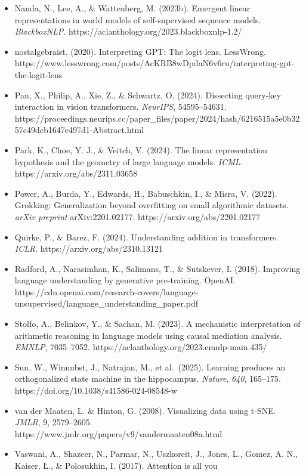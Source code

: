 \documentclass[
  11pt,
  a4paper,
]{article}
\begin{document}
\begin{itemize}
\item
  Nanda, N., Lee, A., \& Wattenberg, M. (2023b). Emergent linear
  representations in world models of self-supervised sequence models.
  \emph{BlackboxNLP}. https://aclanthology.org/2023.blackboxnlp-1.2/
\item
  nostalgebraist. (2020). Interpreting GPT: The logit lens. LessWrong.
  https://www.lesswrong.com/posts/AcKRB8wDpdaN6v6ru/interpreting-gpt-the-logit-lens
\item
  Pan, X., Philip, A., Xie, Z., \& Schwartz, O. (2024). Dissecting
  query-key interaction in vision transformers. \emph{NeurIPS},
  54595--54631.
  https://proceedings.neurips.cc/paper\_files/paper/2024/hash/6216515a5e0b3257c49dcb1647e497d1-Abstract.html
\item
  Park, K., Choe, Y. J., \& Veitch, V. (2024). The linear representation
  hypothesis and the geometry of large language models. \emph{ICML}.
  https://arxiv.org/abs/2311.03658
\item
  Power, A., Burda, Y., Edwards, H., Babuschkin, I., \& Misra, V.
  (2022). Grokking: Generalization beyond overfitting on small
  algorithmic datasets. \emph{arXiv preprint} arXiv:2201.02177.
  https://arxiv.org/abs/2201.02177
\item
  Quirke, P., \& Barez, F. (2024). Understanding addition in
  transformers. \emph{ICLR}. https://arxiv.org/abs/2310.13121
\item
  Radford, A., Narasimhan, K., Salimans, T., \& Sutskever, I. (2018).
  Improving language understanding by generative pre-training. OpenAI.
  https://cdn.openai.com/research-covers/language-unsupervised/language\_understanding\_paper.pdf
\item
  Stolfo, A., Belinkov, Y., \& Sachan, M. (2023). A mechanistic
  interpretation of arithmetic reasoning in language models using causal
  mediation analysis. \emph{EMNLP}, 7035--7052.
  https://aclanthology.org/2023.emnlp-main.435/
\item
  Sun, W., Winnubst, J., Natrajan, M., et al.~(2025). Learning produces
  an orthogonalized state machine in the hippocampus. \emph{Nature},
  \emph{640}, 165--175. https://doi.org/10.1038/s41586-024-08548-w
\item
  van der Maaten, L. \& Hinton, G. (2008). Visualizing data using t-SNE.
  \emph{JMLR}, 9, 2579--2605.
  https://www.jmlr.org/papers/v9/vandermaaten08a.html
\item
  Vaswani, A., Shazeer, N., Parmar, N., Uszkoreit, J., Jones, L., Gomez,
  A. N., Kaiser, Ł., \& Polosukhin, I. (2017). Attention is all you

\end{itemize}
\end{document}
